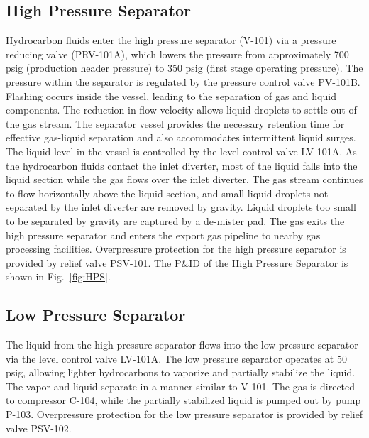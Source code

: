 \documentclass[conference]{IEEEtran}
\begin{document}
\subsection{High Pressure Separator}\label{HPS}
Hydrocarbon fluids enter the high pressure separator (V-101) via a pressure reducing valve (PRV-101A), which lowers the pressure from approximately 700 psig (production header pressure) to 350 psig (first stage operating pressure). The pressure within the separator is regulated by the pressure control valve PV-101B. Flashing occurs inside the vessel, leading to the separation of gas and liquid components. The reduction in flow velocity allows liquid droplets to settle out of the gas stream. The separator vessel provides the necessary retention time for effective gas-liquid separation and also accommodates intermittent liquid surges. The liquid level in the vessel is controlled by the level control valve LV-101A. As the hydrocarbon fluids contact the inlet diverter, most of the liquid falls into the liquid section while the gas flows over the inlet diverter. The gas stream continues to flow horizontally above the liquid section, and small liquid droplets not separated by the inlet diverter are removed by gravity. Liquid droplets too small to be separated by gravity are captured by a de-mister pad. The gas exits the high pressure separator and enters the export gas pipeline to nearby gas processing facilities. Overpressure protection for the high pressure separator is provided by relief valve PSV-101. The P\&ID of the High Pressure Separator is shown in Fig.~\ref{fig:HPS}.


\subsection{Low Pressure Separator}\label{LPS}


The liquid from the high pressure separator flows into the low pressure separator via the level control valve LV-101A. The low pressure separator operates at 50 psig, allowing lighter hydrocarbons to vaporize and partially stabilize the liquid. The vapor and liquid separate in a manner similar to V-101. The gas is directed to compressor C-104, while the partially stabilized liquid is pumped out by pump P-103. Overpressure protection for the low pressure separator is provided by relief valve PSV-102.
\end{document}
